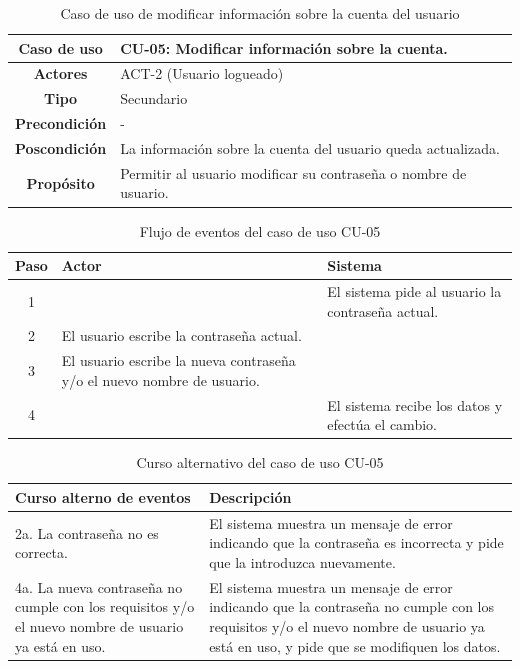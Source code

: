 \begin{table}[H]
\centering
\begin{tabular}{|c|p{10cm}|}
\hline
\rowcolor{green!40} \textbf{Caso de uso} & CU-05: Modificar información sobre la cuenta. \\ \hline
\rowcolor{blue!10} \textbf{Actores} & ACT-2 (Usuario logueado) \\ \hline
\rowcolor{blue!10} \textbf{Tipo} & Secundario \\ \hline
\rowcolor{blue!10} \textbf{Precondición} & - \\ \hline
\rowcolor{blue!10} \textbf{Poscondición} & La información sobre la cuenta del usuario queda actualizada. \\ \hline
\rowcolor{blue!10} \textbf{Propósito} & Permitir al usuario modificar su contraseña o nombre de usuario. \\ \hline
\end{tabular}
\caption{Caso de uso de modificar información sobre la cuenta del usuario}
\end{table}

\begin{table}[H]
\centering
\begin{tabular}{|c|p{5cm}|p{5cm}|}
\hline
\rowcolor{green!40} \textbf{Paso} & \textbf{Actor} & \textbf{Sistema} \\ \hline
\rowcolor{blue!10} 1 &  & El sistema pide al usuario la contraseña actual. \\ \hline
\rowcolor{blue!10} 2 & El usuario escribe la contraseña actual. & \\ \hline
\rowcolor{blue!10} 3 & El usuario escribe la nueva contraseña y/o el nuevo nombre de usuario. & \\ \hline
\rowcolor{blue!10} 4 &  & El sistema recibe los datos y efectúa el cambio. \\ \hline
\end{tabular}
\caption{Flujo de eventos del caso de uso CU-05}
\end{table}

\begin{table}[H]
\centering
\begin{tabular}{|p{4cm}|p{8cm}|}
\hline
\rowcolor{green!40} \textbf{Curso alterno de eventos} & \textbf{Descripción} \\ \hline
\rowcolor{blue!10} 2a. La contraseña no es correcta. & El sistema muestra un mensaje de error indicando que la contraseña es incorrecta y pide que la introduzca nuevamente. \\ \hline
\rowcolor{blue!10} 4a. La nueva contraseña no cumple con los requisitos y/o el nuevo nombre de usuario ya está en uso. & El sistema muestra un mensaje de error indicando que la contraseña no cumple con los requisitos y/o el nuevo nombre de usuario ya está en uso, y pide que se modifiquen los datos. \\ \hline
\end{tabular}
\caption{Curso alternativo del caso de uso CU-05}
\end{table}

